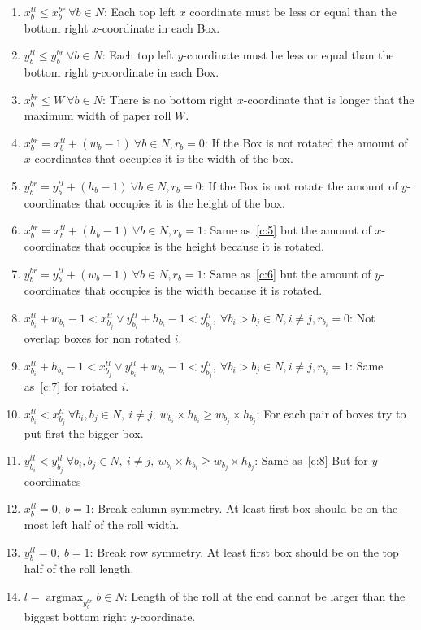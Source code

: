 \documentclass[12pt, a4paper]{article}
\DeclareMathOperator*{\argmax}{argmax} %
\begin{document}
\begin{enumerate}
  \item $x_b^{tl} \leq x_b^{br}\ \forall b \in N$: Each top left $x$ coordinate must be less or equal than the bottom right $x$-coordinate in each Box.
  \item $y_b^{tl} \leq y_b^{br}\ \forall b \in N$: Each top left $y$-coordinate must be less or equal than the bottom right $y$-coordinate in each Box.
  \item\label{c:4} $x_b^{br} \leq W\ \forall b \in N$: There is no bottom right $x$-coordinate that is longer that the maximum width of paper roll $W$.
\item\label{c:5} $x_b^{br} = x_b^{tl} + (w_b - 1)\ \forall b \in N, r_b = 0$: If the Box is not rotated the amount of $x$ coordinates that occupies it is the width of the box.
\item\label{c:6} $y_b^{br} = y_b^{tl} + (h_b - 1)\ \forall b \in N, r_b = 0$: If the Box is not rotate the amount of $y$-coordinates that occupies it is the height of the box.
\item $x_b^{br} = x_b^{tl} + (h_b - 1)\ \forall b \in N, r_b = 1$: Same as~\ref{c:5} but the amount of $x$-coordinates that occupies is the height because it is rotated.
  \item $y_b^{br} = y_b^{tl} + (w_b - 1)\ \forall b \in N, r_b = 1$: Same as~\ref{c:6} but the amount of $y$-coordinates that occupies is the width because it is rotated.
  \item\label{c:7} $x_{b_i}^{tl} + w_{b_i} - 1 < x_{b_j}^{tl} \lor y_{b_i}^{tl} + h_{b_i} - 1 < y_{b_j}^{tl}, \ \forall b_i > b_j \in N, i \neq j, r_{b_i} = 0$: Not overlap boxes for non rotated $i$.
  \item $x_{b_i}^{tl} + h_{b_i} - 1 < x_{b_j}^{tl} \lor y_{b_i}^{tl} + w_{b_i} - 1 < y_{b_j}^{tl}, \ \forall b_i > b_j \in N, i \neq j, r_{b_i} = 1$: Same as~\ref{c:7} for rotated $i$.
  \item\label{c:8} $x_{b_i}^{tl} < x_{b_j}^{tl}\ \forall b_i, b_j \in N,\ i \neq j,\ w_{b_i} \times h_{b_i} \geq w_{b_j} \times h_{b_j}$: For each pair of boxes try to put first the bigger box.
  \item $y_{b_i}^{tl} < y_{b_j}^{tl}\ \forall b_i, b_j \in N,\ i \neq j,\ w_{b_i} \times h_{b_i} \geq w_{b_j} \times h_{b_j}$: Same as~\ref{c:8} But for $y$ coordinates
  \item $x_b^{tl} = 0,\ b = 1$: Break column symmetry. At least first box should be on the most left half of the roll width.
   \item $y_b^{tl} = 0,\ b = 1$: Break row symmetry. At least first box should be on the top half of the roll length.
  \item $l = \argmax_{y_b^{br}} {b \in N}$: Length of the roll at the end cannot be larger than the biggest bottom right $y$-coordinate.
\end{enumerate}
\end{document}
